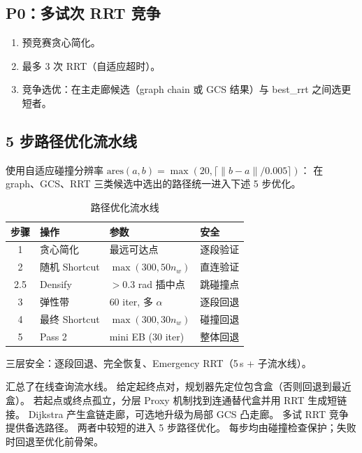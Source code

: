 \documentclass[journal]{IEEEtran}
\begin{document}
\subsection{P0：多试次 RRT 竞争}

\begin{enumerate}[nosep]
  \item 预竞赛贪心简化。
  \item 最多 3 次 RRT（自适应超时）。
  \item 竞争选优：在主走廊候选（graph chain 或 GCS 结果）与
    best\_rrt 之间选更短者。
\end{enumerate}

\subsection{5 步路径优化流水线}

使用自适应碰撞分辨率
$\mathrm{ares}(a,b) = \max(20, \lceil\|b-a\|/0.005\rceil)$：
在 graph、GCS、RRT 三类候选中选出的路径统一进入下述 5 步优化。

\begin{table}[ht]
\centering
\caption{路径优化流水线}
\label{tab:pipeline}
\begin{tabular}{@{}clll@{}}
\toprule
\textbf{步骤} & \textbf{操作} & \textbf{参数} & \textbf{安全} \\
\midrule
1 & 贪心简化 & 最远可达点 & 逐段验证 \\
2 & 随机 Shortcut & $\max(300, 50 n_w)$ & 直连验证 \\
2.5 & Densify & $> 0.3$ rad 插中点 & 跳碰撞点 \\
3 & 弹性带 & 60 iter, 多 $\alpha$ & 逐段回退 \\
4 & 最终 Shortcut & $\max(300, 30 n_w)$ & 碰撞回退 \\
5 & Pass 2 & mini EB (30 iter) & 整体回退 \\
\bottomrule
\end{tabular}
\end{table}

三层安全：逐段回退、完全恢复、Emergency RRT（5\,s + 子流水线）。

 汇总了在线查询流水线。
给定起终点对，规划器先定位包含盒（否则回退到最近盒）。
若起点或终点孤立，分层 Proxy 机制找到连通替代盒并用 RRT 生成短链接。
Dijkstra 产生盒链走廊，可选地升级为局部 GCS 凸走廊。
多试 RRT 竞争提供备选路径。
两者中较短的进入 5 步路径优化。
每步均由碰撞检查保护；失败时回退至优化前骨架。
\end{document}
